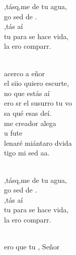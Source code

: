 \begin{cancion}%
	\begin{chorus}%
	,tásq,me de tu agua, \\
	go sed de .\\
	,tás aí\\
	tu para se hace vida,\\
	la ero comparr.\\
	\end{chorus}%
	\jump\\
	acerco a eñor\\
	el siio quiero escurte,\\
	no que estás aí\\
	ero sr el susurro tu vo\\
	sa qué esas deí.\\
	me creador  alega \\
	 u fute \\
	lenaré miántaro dvida\\
	tigo mi sed aa. \\\jump\\
	\begin{chorus}%
	,tásq,me de tu agua, \\
	go sed de .\\
	,tás aí\\
	tu para se hace vida,\\
	la ero comparr.\\
	\end{chorus}%
	\jump\\
	ero que tu , Señor\\

\end{cancion}
